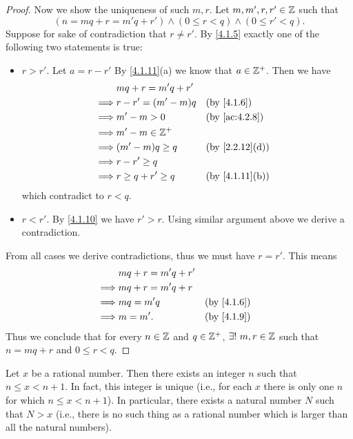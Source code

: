 \begin{proof}
  Now we show the uniqueness of such \(m, r\).
  Let \(m, m', r, r' \in \mathbb{Z}\) such that
  \[
    (n = mq + r = m'q + r') \land (0 \leq r < q) \land (0 \leq r' < q).
  \]
  Suppose for sake of contradiction that \(r \neq r'\).
  By \cref{4.1.5} exactly one of the following two statements is true:
  \begin{itemize}
    \item \(r > r'\).
          Let \(a = r - r'\)
          By \cref{4.1.11}(a) we know that \(a \in \mathbb{Z}^+\).
          Then we have
          \begin{align*}
                     & mq + r = m'q + r'                        \\
            \implies & r - r' = (m' - m)q   &  & \by{4.1.6}     \\
            \implies & m' - m > 0           &  & \by{ac:4.2.8}  \\
            \implies & m' - m \in \Z^+                          \\
            \implies & (m' - m)q \geq q     &  & \by{2.2.12}[d] \\
            \implies & r - r' \geq q                            \\
            \implies & r \geq q + r' \geq q &  & \by{4.1.11}[b]
          \end{align*}
          which contradict to \(r < q\).
    \item \(r < r'\).
          By \cref{4.1.10} we have \(r' > r\).
          Using similar argument above we derive a contradiction.
  \end{itemize}
  From all cases we derive contradictions, thus we must have \(r = r'\).
  This means
  \begin{align*}
             & mq + r = m'q + r'                 \\
    \implies & mq + r = m'q + r                  \\
    \implies & mq = m'q          &  & \by{4.1.6} \\
    \implies & m = m'.           &  & \by{4.1.9}
  \end{align*}
  Thus we conclude that for every \(n \in \mathbb{Z}\) and \(q \in \mathbb{Z}^+\), \(\exists!\ m, r \in \mathbb{Z}\) such that \(n = mq + r\) and \(0 \leq r < q\).
\end{proof}

\begin{prop}\label{4.4.1}
  Let \(x\) be a rational number.
  Then there exists an integer \(n\) such that \(n \leq x < n + 1\).
  In fact, this integer is unique (i.e., for each \(x\) there is only one \(n\) for which \(n \leq x < n + 1\)).
  In particular, there exists a natural number \(N\) such that \(N > x\)
  (i.e., there is no such thing as a rational number which is larger than all the natural numbers).
\end{prop}

